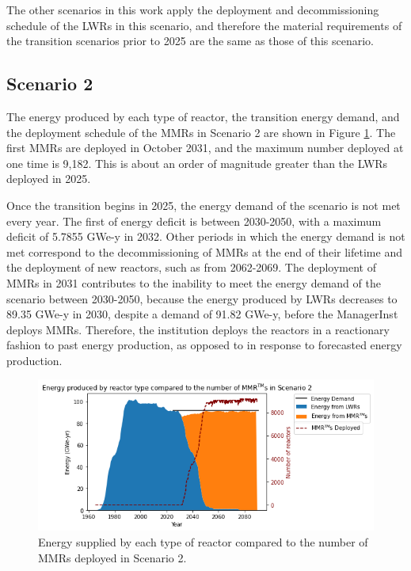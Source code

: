 The other scenarios in this work apply the deployment and decommissioning 
schedule of the \glspl{LWR} in this scenario, and therefore the material 
requirements of the transition scenarios prior to 2025 are the 
same as those of this scenario.  

\subsection{Scenario 2}
The energy produced by each type of reactor, the transition energy demand, 
and the deployment schedule of the \glspl{MMR} in Scenario 2 are shown in 
Figure \ref{fig:energy_rx_2}. The first \glspl{MMR} are deployed in 
October 2031, and the maximum number deployed at one time is 
9,182. This is about an order of magnitude greater than the \glspl{LWR}
deployed in 2025.

Once the transition begins in 2025, the energy demand of the scenario is 
not met every year. The first of energy deficit is between 2030-2050, with a 
maximum deficit 
of 5.7855 GWe-y in 2032. Other periods in which the energy demand is not met 
correspond to the decommissioning of \glspl{MMR} at the end of their lifetime 
and the deployment of new reactors, such as from 2062-2069. 
The deployment of \glspl{MMR} in 2031 contributes to the inability to 
meet the energy demand of the scenario between 2030-2050, because the energy 
produced by 
\glspl{LWR} decreases to 89.35 GWe-y in 2030, despite a demand of 91.82
GWe-y, before the \Cycamore ManagerInst deploys \glspl{MMR}.
Therefore, the institution deploys the reactors in a reactionary fashion to 
past energy production, as opposed to in response to forecasted energy 
production.

\begin{figure}
    \centering 
    \includegraphics[width=\textwidth]{../figures/energy_scenario2.png}
    \caption{Energy supplied by each type of reactor compared to the number of 
    \glspl{MMR} deployed in Scenario 2.}
    \label{fig:energy_rx_2}
\end{figure}

